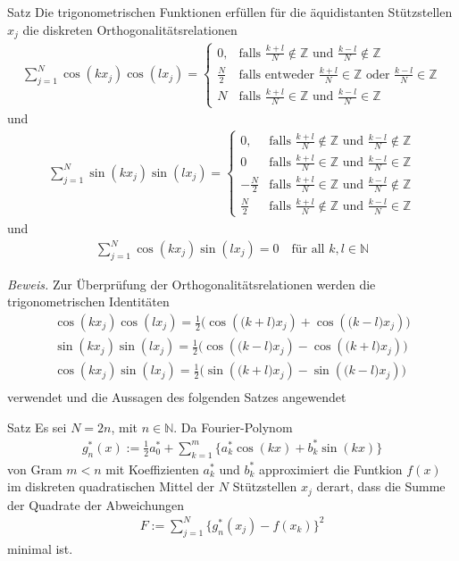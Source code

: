 \begin{colbox}{Satz}
  Die trigonometrischen Funktionen erfüllen für die äquidistanten Stützstellen $x_j$ die diskreten Orthogonalitätsrelationen
  \begin{align*}
    \sum_{j=1}^{N} \cos(kx_j)\cos(lx_j) = \begin{cases}
      0, &\text{falls } \tfrac{k+l}{N}\notin \mathbb{Z} \text{ und } \tfrac{k-l}{N}\notin \mathbb{Z} \\
      \tfrac{N}{2} &\text{falls entweder } \tfrac{k+l}{N}\in \mathbb{Z} \text{ oder } \tfrac{k-l}{N}\in \mathbb{Z} \\
      N &\text{falls } \tfrac{k+l}{N}\in \mathbb{Z} \text{ und } \tfrac{k-l}{N}\in \mathbb{Z}
    \end{cases}
  \end{align*}
  und 
  \begin{align*}
    \sum_{j=1}^{N} \sin(kx_j)\sin(lx_j) = \begin{cases}
      0, &\text{falls } \tfrac{k+l}{N}\notin \mathbb{Z} \text{ und } \tfrac{k-l}{N}\notin \mathbb{Z} \\
      0 &\text{falls } \tfrac{k+l}{N}\in \mathbb{Z} \text{ und } \tfrac{k-l}{N}\in \mathbb{Z} \\
      -\tfrac{N}{2} &\text{falls } \tfrac{k+l}{N}\in \mathbb{Z} \text{ und } \tfrac{k-l}{N}\notin \mathbb{Z} \\
      \tfrac{N}{2} &\text{falls } \tfrac{k+l}{N}\notin \mathbb{Z} \text{ und } \tfrac{k-l}{N}\in \mathbb{Z}
    \end{cases}
  \end{align*}
  und 
  \begin{align*}
    \sum_{j=1}^{N} \cos(kx_j)\sin(lx_j) = 0 \quad \text{für all } k,l\in\mathbb{N}
  \end{align*}
\end{colbox}
\textit{Beweis.} Zur Überprüfung der Orthogonalitätsrelationen werden die trigonometrischen Identitäten
\begin{align*}
  \cos(kx_j)\cos(lx_j) = \tfrac{1}{2}\Big(\cos(\big(k+l\big)x_j) + \cos(\big(k-l\big)x_j)\Big) \\
  \sin(kx_j)\sin(lx_j) = \tfrac{1}{2}\Big(\cos(\big(k-l\big)x_j) - \cos(\big(k+l\big)x_j)\Big) \\
  \cos(kx_j)\sin(lx_j) = \tfrac{1}{2}\Big(\sin(\big(k+l\big)x_j) - \sin(\big(k-l\big)x_j)\Big) \\
\end{align*}
verwendet und die Aussagen des folgenden Satzes angewendet
\begin{colbox}{Satz}
  Es sei $N=2n$, mit $n\in\mathbb{N}$. Da Fourier-Polynom
  \begin{align*}
  g_n^*(x) := \tfrac{1}{2}a^*_0 + \sum_{k=1}^{m}\{a^*_k\cos(kx)+b^*_k\sin(kx)\}
  \end{align*}
  von Gram $m<n$ mit Koeffizienten $a_k^*$ und $b^*_k$ approximiert die Funtkion $f(x)$ im diskreten quadratischen 
  Mittel der $N$ Stützstellen $x_j$ derart, dass die Summe der Quadrate der Abweichungen
  \begin{align*}
  F:=\sum_{j=1}^{N}\{g^*_n(x_j)-f(x_k)\}^2
  \end{align*}
  minimal ist.
\end{colbox}
